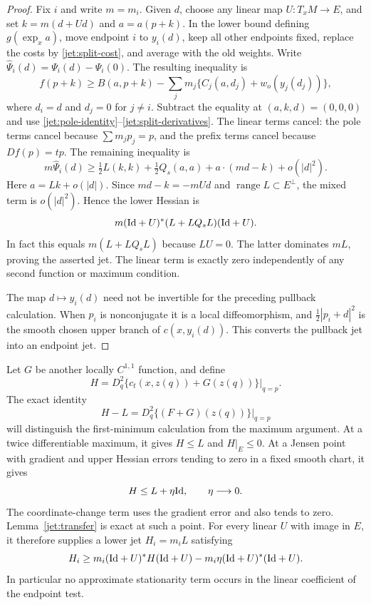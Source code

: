 \begin{proof}
Fix $i$ and write $m=m_i$. Given $d$, choose any linear map
$U:T_xM\to E$, and set $k=m(d+Ud)$ and $a=a(p+k)$.
In the lower bound defining $g(\exp_xa)$, move endpoint $i$ to
$y_i(d)$, keep all other endpoints fixed, replace the costs by
\eqref{jet:split-cost}, and average with the old weights. Write
$\widehat\Psi_i(d)=\Psi_i(d)-\Psi_i(0)$. The resulting inequality is
\[
 f(p+k)\ge
 B(a,p+k)-\sum_jm_j\{C_j(a,d_j)+w_o(y_j(d_j))\},
\]
where $d_i=d$ and $d_j=0$ for $j\ne i$. Subtract the equality at
$(a,k,d)=(0,0,0)$ and use
\eqref{jet:pole-identity}--\eqref{jet:split-derivatives}. The linear
terms cancel: the pole terms cancel because $\sum m_jp_j=p$, and
the prefix terms cancel because $Df(p)=tp$. The remaining inequality is
\begin{equation}\label{jet:quadratic-transfer}
 m\widehat\Psi_i(d)\ge
 \tfrac12L(k,k)+\tfrac12Q_s(a,a)
 +a\cdot(md-k)+o(|d|^2).
\end{equation}
Here $a=Lk+o(|d|)$. Since $md-k=-mUd$ and
$\operatorname{range}L\subset E^\perp$, the mixed term is
$o(|d|^2)$. Hence the lower Hessian is
\[
 m(\mathrm{Id}+U)^*(L+LQ_sL)(\mathrm{Id}+U).
\]
In fact this equals $m(L+LQ_sL)$ because $LU=0$. The latter
dominates $mL$, proving the asserted jet. The linear term is exactly
zero independently of any second function or maximum condition.

The map $d\mapsto y_i(d)$ need not be invertible for the preceding
pullback calculation. When $p_i$ is nonconjugate it is a local
diffeomorphism, and $\tfrac12|p_i+d|^2$ is the smooth chosen
upper branch of $c(x,y_i(d))$. This converts the pullback jet into
an endpoint jet.
\end{proof}

Let $G$ be another locally $C^{1,1}$ function, and define
\begin{equation}\label{jet:H-definition}
 H=D_q^2\{c_t(x,z(q))+G(z(q))\}\big|_{q=p}.
\end{equation}
The exact identity
\begin{equation}\label{jet:H-minus-L}
 H-L=D_q^2\{(F+G)(z(q))\}\big|_{q=p}
\end{equation}
will distinguish the first-minimum calculation from the maximum
argument. At a twice differentiable maximum, it gives $H\le L$ and
$H|_E\le0$. At a Jensen point with gradient and upper Hessian errors
tending to zero in a fixed smooth chart, it gives
\begin{equation}\label{jet:Jensen-error}
 H\le L+\eta\mathrm{Id},\qquad \eta\longrightarrow0.
\end{equation}
The coordinate-change term uses the gradient error and also tends to
zero. Lemma~\ref{jet:transfer} is exact at such a point. For every
linear $U$ with image in $E$, it therefore supplies a lower jet
$H_i=m_iL$ satisfying
\[
 H_i\ge m_i(\mathrm{Id}+U)^*H(\mathrm{Id}+U)
       -m_i\eta(\mathrm{Id}+U)^*(\mathrm{Id}+U).
\]
In particular no approximate stationarity term occurs in the
linear coefficient of the endpoint test.

